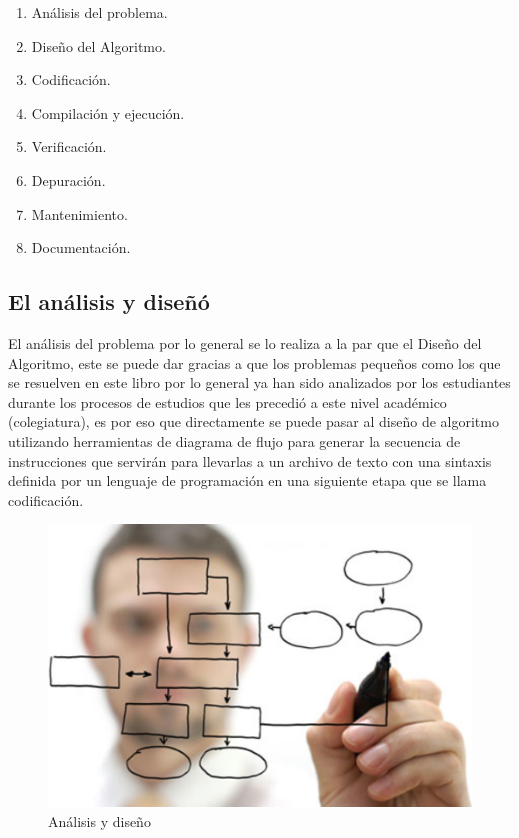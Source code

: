 \documentclass[a4paper,12pt,spanish]{article}
\begin{document}
\begin{minipage}[H]{0.45\linewidth}
  \begin{enumerate}
    \item Análisis del problema.
    \item Diseño del Algoritmo.
    \item Codificación.
    \item Compilación y ejecución.
  \end{enumerate}
  
\end{minipage}
\begin{minipage}[H]{0.45\linewidth}
  \begin{enumerate}
    \setcounter{enumi}{4}
    \item Verificación.
    \item Depuración.
    \item Mantenimiento.
    \item Documentación.
  \end{enumerate}
  
\end{minipage}


\subsection{El análisis y diseñó}
\label{sec:el-analisis-y}

El análisis del problema por lo general se lo realiza a la par que el
Diseño del Algoritmo, este se puede dar gracias a que los problemas
pequeños como los que se resuelven en este libro por lo general ya han
sido analizados por los estudiantes durante los procesos de estudios
que les precedió a este nivel académico (colegiatura), es por eso que
directamente se puede pasar al diseño de algoritmo utilizando
herramientas de diagrama de flujo para generar la secuencia de
instrucciones que servirán para llevarlas a un 
archivo  de texto con una sintaxis definida por un lenguaje de
programación en una siguiente etapa que se llama codificación.
\begin{figure}[H]
  \centering
  \includegraphics[scale=0.1]{analisis}
  \caption{Análisis y diseño}
  \label{fig:analisis}
\end{figure}
\end{document}
